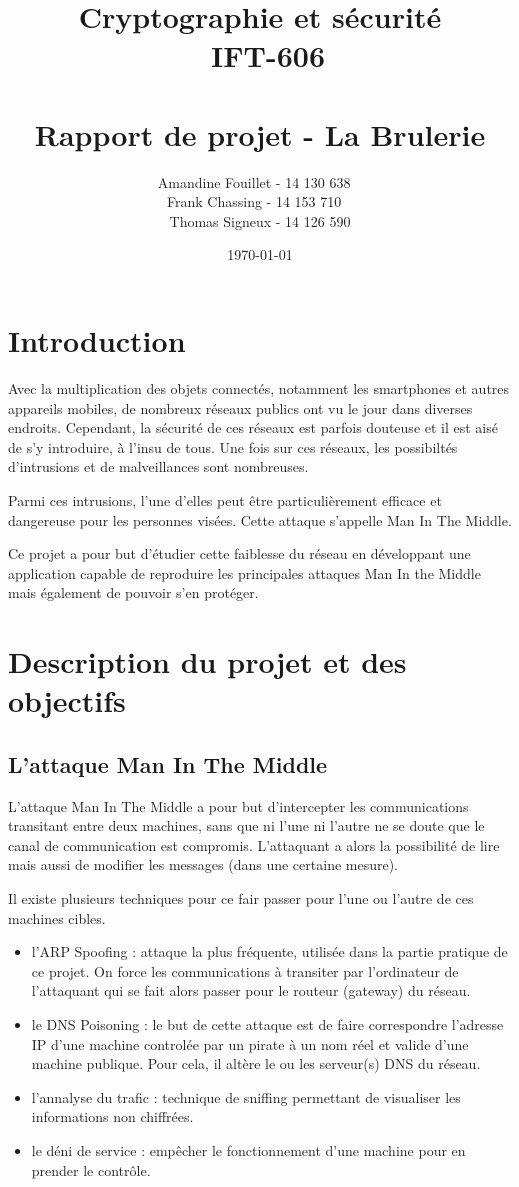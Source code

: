 \documentclass[11pt]{article}
\title{\vspace{\fill} Cryptographie et sécurité \\ ~\textbf{IFT-606} \\~\\ Rapport de projet - La Brulerie}
\author{Amandine Fouillet - 14 130 638  ~\\ Frank Chassing - 14 153 710 ~\\ Thomas Signeux - 14 126 590}
\date{\today \vspace{\fill}}
\begin{document}
\maketitle
\newpage \thispagestyle{empty}
\null
\newpage
\tableofcontents
\newpage
\section*{Introduction}
Avec la multiplication des objets connectés, notamment les smartphones et autres appareils mobiles, de nombreux réseaux publics ont vu le jour dans diverses endroits. Cependant, la sécurité de ces réseaux est parfois douteuse et il est aisé de s’y introduire, à l'insu de tous. Une fois sur ces réseaux, les possibiltés d'intrusions et de malveillances sont nombreuses. 

Parmi ces intrusions, l'une d'elles peut être particulièrement efficace et dangereuse pour les personnes visées. Cette attaque s'appelle Man In The Middle.

Ce projet a pour but d'étudier cette faiblesse du réseau en développant une application capable de reproduire les principales attaques Man In the Middle mais également de pouvoir s'en protéger.

\section{Description du projet et des objectifs}

\subsection{L'attaque Man In The Middle}
L’attaque Man In The Middle a pour but d’intercepter les communications transitant entre deux machines, sans que ni l’une ni l’autre ne se doute que le canal de communication est compromis.
L’attaquant a alors la possibilité de lire mais aussi de modifier les messages  (dans une certaine mesure).

Il existe plusieurs techniques pour ce fair passer pour l'une ou l'autre de ces machines cibles.

\begin{itemize}
	\item l'ARP Spoofing : attaque la plus fréquente, utilisée dans la partie pratique de ce projet. On force les communications à transiter par l'ordinateur de l'attaquant qui se fait alors passer pour le routeur (gateway) du réseau.
	\item le DNS Poisoning : le but de cette attaque est de faire correspondre l'adresse IP d'une machine controlée par un pirate à un nom réel et valide d'une machine publique. Pour cela, il altère le ou les serveur(s) DNS du réseau.
	\item l'annalyse du trafic : technique de sniffing permettant de visualiser les informations non chiffrées.
	\item le déni de service : empêcher le fonctionnement d'une machine pour en prender le contrôle.
\end{itemize}
\end{document}
